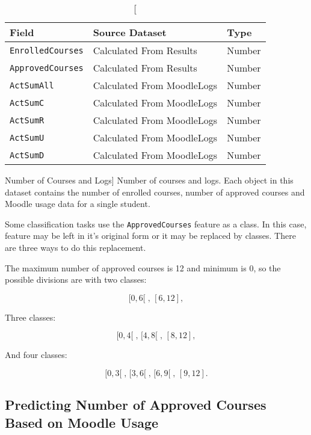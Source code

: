 \begin{table}[h!]
    \centering

    \begin{tabular}{| l | l | l |}
        \hline
        \textbf{Field}           & \textbf{Source Dataset}    & \textbf{Type} \\ \hline
        \texttt{EnrolledCourses} & Calculated From Results    & Number        \\ \hline
        \texttt{ApprovedCourses} & Calculated From Results    & Number        \\ \hline
        \texttt{ActSumAll}       & Calculated From MoodleLogs & Number        \\ \hline
        \texttt{ActSumC}         & Calculated From MoodleLogs & Number        \\ \hline
        \texttt{ActSumR}         & Calculated From MoodleLogs & Number        \\ \hline
        \texttt{ActSumU}         & Calculated From MoodleLogs & Number        \\ \hline
        \texttt{ActSumD}         & Calculated From MoodleLogs & Number        \\ \hline
    \end{tabular}

    \caption
        [Number of Courses and Logs]
        {Number of courses and logs. Each object in this dataset contains the
        number of enrolled courses, number of approved courses and Moodle usage
        data for a single student.}

    \label{tab:dat_002}
\end{table}

Some classification tasks use the \texttt{ApprovedCourses} feature as a class.
In this case, feature may be left in it's original form or it may be replaced
by classes. There are three ways to do this replacement.

The maximum number of approved courses is 12 and minimum is 0, so the possible
divisions are with two classes:

\[
    [0, 6[\;,\, [6, 12],
\]

Three classes:

\[
    [0, 4[\;,\, [4, 8[\;,\, [8, 12],
\]

And four classes:

\[
    [0, 3[\;,\, [3, 6[\;,\, [6, 9[\;,\, [9, 12].
\]

\subsection{Predicting Number of Approved Courses Based on Moodle Usage}
\label{sec:exp_003}

